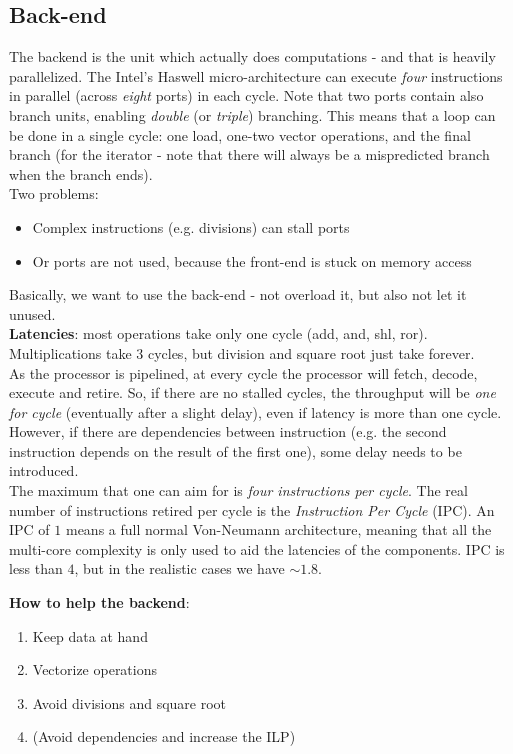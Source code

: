 \documentclass[../template.tex]{subfiles}
\begin{document}
\subsection{Back-end}
The backend is the unit which actually does computations - and that is heavily parallelized. The Intel's Haswell micro-architecture can execute \textit{four} instructions in parallel (across \textit{eight} ports) in each cycle. Note that two ports contain also branch units, enabling \textit{double} (or \textit{triple}) branching. This means that a loop can be done in a single cycle: one load, one-two vector operations, and the final branch (for the iterator - note that there will always be a mispredicted branch when the branch ends).\\

Two problems:
\begin{itemize}
    \item Complex instructions (e.g. divisions) can stall ports
    \item Or ports are not used, because the front-end is stuck on memory access
\end{itemize}
Basically, we want to use the back-end  - not overload it, but also not let it unused.\\

\textbf{Latencies}: most operations take only one cycle (add, and, shl, ror). Multiplications take $3$ cycles, but division and square root just take forever.\\
As the processor is pipelined, at every cycle the processor will fetch, decode, execute and retire. So, if there are no stalled cycles, the throughput will be \textit{one for cycle} (eventually after a slight delay), even if latency is more than one cycle.\\
However, if there are dependencies between instruction (e.g. the second instruction depends on the result of the first one), some delay needs to be introduced.\\
The maximum that one can aim for is \textit{four instructions per cycle}. The real number of instructions retired per cycle is the \textit{Instruction Per Cycle} (IPC). An IPC of $1$ means a full normal Von-Neumann architecture, meaning that all the multi-core complexity is only used to aid the latencies of the components. IPC is less than $4$, but in the realistic cases we have $\sim 1.8$.


\textbf{How to help the backend}: 
\begin{enumerate}
    \item Keep data at hand
    \item Vectorize operations
    \item Avoid divisions and square root
    \item (Avoid dependencies and increase the ILP)
\end{enumerate}
\end{document}
